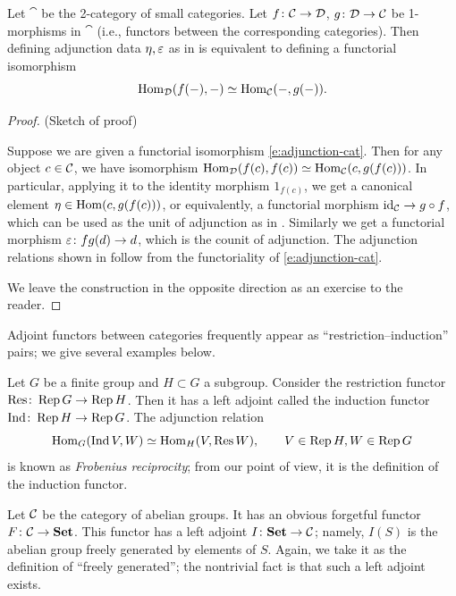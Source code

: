\begin{theorem}\label{t:adjunction-cat}
  Let $\cat$ be the 2-category of small categories. Let $f\colon \mathcal{C}\to
  \mathcal{D}$, $g\colon \mathcal{D}\to \mathcal{C}$ be 1-morphisms in $\cat$ \textup{(}i.e., functors
  between the corresponding categories\textup{)}. Then defining adjunction data
  $\eta, \varepsilon$ as in  is equivalent to defining
  a functorial isomorphism
  \begin{equation}\label{e:adjunction-cat}
    \operatorname{Hom}_{\mathcal{D}}(f(-), -)\simeq \operatorname{Hom}_{\mathcal{C}}(-, g(-)).
  \end{equation}
\end{theorem}
\begin{proof}
  (Sketch of proof)

  Suppose we are given a functorial isomorphism \eqref{e:adjunction-cat}. Then
  for any object $c\in \mathcal{C}$, we have isomorphism $\operatorname{Hom}_{\mathcal{D}}(f(c),
  f(c))\simeq \operatorname{Hom}_{\mathcal{C}}(c, g(f(c)))$. In particular, applying it to the
  identity morphism $1_{f(c)}$, we get a canonical element $\eta\in \operatorname{Hom}(c,
  g(f(c)))$, or equivalently, a functorial morphism $\operatorname{id}_{\mathcal{C}}\to g\circ f$,
  which can be used as the unit of adjunction as in .
  Similarly we get a functorial morphism $\varepsilon\colon fg(d)\to d$, which is the
  counit of adjunction. The adjunction relations shown in
   follow from the functoriality of
  \eqref{e:adjunction-cat}.

  We leave the construction in the opposite direction as an exercise to the
  reader.

\end{proof}

Adjoint functors between categories frequently appear as
``restriction--induction'' pairs; we give several examples below.
\begin{example}\label{x:coset-bimodule}
  Let $G$ be a finite group and $H\subset G$ a subgroup. Consider the
  restriction functor $\operatorname{Res}\colon \operatorname{Rep} G\to \operatorname{Rep} H$. Then it has a left adjoint
  called the induction functor $\operatorname{Ind} \colon \operatorname{Rep} H\to \operatorname{Rep} G$. The adjunction
  relation
  $$
  \operatorname{Hom}_G(\operatorname{Ind} V, W)\simeq \operatorname{Hom}_H(V, \operatorname{Res} W), \qquad V\in \operatorname{Rep} H, W\in \operatorname{Rep} G
  $$
  is known as \emph{Frobenius reciprocity};
  from our point of view, it is the
  definition of the induction functor.
 \end{example}

\begin{example}\label{x:abelian-groups-duality}
  Let $\mathcal{C}$ be the category of abelian groups. It has an obvious forgetful
  functor $F\colon \mathcal{C}\to\mathbf{Set}$. This functor has a left adjoint
  $I\colon\mathbf{Set}\to \mathcal{C}$; namely, $I(S)$ is the abelian group freely generated
  by elements of $S$. Again, we take it as the definition of ``freely
  generated''; the nontrivial fact is that such a left adjoint exists.
\end{example}


